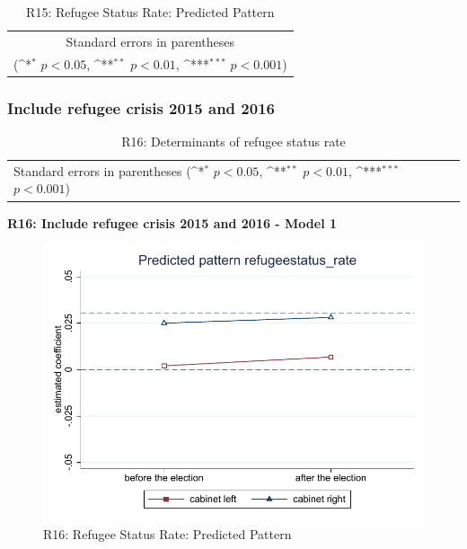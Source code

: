 \documentclass[10pt,a4paper]{scrartcl}
\begin{document}
\begin{table}[!ht]\centering
	\footnotesize
	\renewcommand{\arraystretch}{1.2}
	\def\sym#1{\ifmmode^{#1}\else\(^{#1}\)\fi}
	\caption{R15: Refugee Status Rate: Predicted Pattern}
	\begin{tabular}{l*{2}{c}}
		\hline\hline
		
		\hline\hline
		\multicolumn{3}{c}{\footnotesize Standard errors in parentheses} \\
		\multicolumn{3}{c}{\footnotesize (\sym{*} \(p<0.05\), \sym{**} \(p<0.01\), \sym{***} \(p<0.001\))} \\
	\end{tabular}
\end{table}






\clearpage
\FloatBarrier
\subsubsection{Include refugee crisis 2015 and 2016}
\begin{table}[!ht]\centering
	\renewcommand{\arraystretch}{1.25}
	\small
	\def\sym#1{\ifmmode^{#1}\else\(^{#1}\)\fi}
	\caption{R16: Determinants of refugee status rate}
	\begin{tabular}{l*{3}{c}}
		\hline\hline
		
		\hline\hline
		\multicolumn{4}{l}{\footnotesize Standard errors in parentheses (\sym{*} \(p<0.05\), \sym{**} \(p<0.01\), \sym{***} \(p<0.001\))}\\
	\end{tabular}
\end{table}

\clearpage
\textbf{R16: Include refugee crisis 2015 and 2016 - Model 1}
\begin{figure}[!ht]
	\centering
	\includegraphics[width=1\textwidth]{figures_edited/refugeestatus_rate_graph1_R16.pdf}
	\caption{R16: Refugee Status Rate: Predicted Pattern}
\end{figure}
\end{document}
